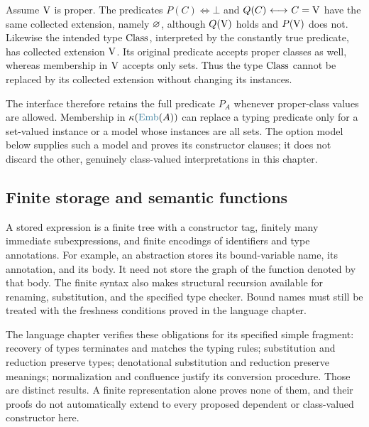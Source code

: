 \begin{example}
Assume $\mathrm{V}$ is proper. The predicates $P(C)\iff\bot$ and
$Q(C){\ \longleftrightarrow\ } C=\mathrm{V}$ have the same collected extension, namely
$\varnothing$, although $Q(\mathrm{V})$ holds and $P(\mathrm{V})$ does not.
Likewise the intended type ${\text{Class}}$, interpreted by the constantly
true predicate, has collected extension $\mathrm{V}$. Its original predicate
accepts proper classes as well, whereas membership in $\mathrm{V}$ accepts
only sets. Thus the type ${\text{Class}}$ cannot be replaced by its collected
extension without changing its instances.
\end{example}

The interface therefore retains the full predicate $P_A$ whenever
proper-class values are allowed. Membership in $\kappa(\Emb(A))$
can replace a typing predicate only for a set-valued instance or a
model whose instances are all sets. The option model below supplies
such a model and proves its constructor clauses; it does not discard
the other, genuinely class-valued interpretations in this chapter.

\subsection{Finite storage and semantic functions}
A stored expression is a finite tree with a constructor tag, finitely
many immediate subexpressions, and finite encodings of identifiers and
type annotations. For example, an abstraction stores its bound-variable
name, its annotation, and its body. It need not store the graph of the
function denoted by that body. The finite syntax also makes structural
recursion available for renaming, substitution, and the specified type
checker. Bound names must still be treated with the freshness conditions
proved in the language chapter.

The language chapter verifies these obligations for its specified simple
fragment: recovery of types terminates and matches the typing rules;
substitution and reduction preserve types; denotational substitution and
reduction preserve meanings; normalization and confluence justify its
conversion procedure. Those are distinct results. A finite representation
alone proves none of them, and their proofs do not automatically extend
to every proposed dependent or class-valued constructor here.

